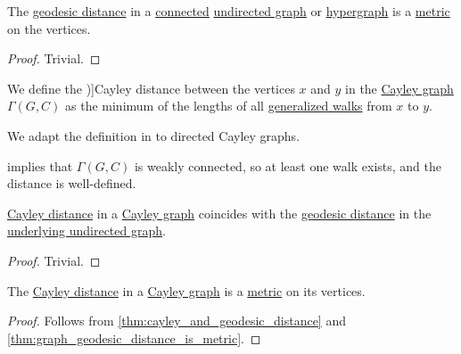 \begin{proposition}\label{thm:graph_geodesic_distance_is_metric}
  The \hyperref[def:graph_geodesic_distance]{geodesic distance} in a \hyperref[def:graph_connectedness/undirected]{connected} \hyperref[def:undirected_graph]{undirected graph} or \hyperref[def:hypergraph]{hypergraph} is a \hyperref[def:metric_space]{metric} on the vertices.
\end{proposition}
\begin{proof}
  Trivial.
\end{proof}

\begin{definition}\label{def:cayley_distance}\mimprovised
  We define the \term[en=Cayley distance (\cite[def. 2.1.10]{HadelerMüller2017CellularAutomata})]{Cayley distance} between the vertices \( x \) and \( y \) in the \hyperref[def:cayley_graph]{Cayley graph} \( \Gamma(G, C) \) as the minimum of the lengths of all \hyperref[def:graph_walk/generalized]{generalized walks} from \( x \) to \( y \).
\end{definition}
\begin{comments}
  \item We adapt the definition in \cite[def. 2.1.10]{HadelerMüller2017CellularAutomata} to directed Cayley graphs.
\end{comments}
\begin{defproof}
   implies that \( \Gamma(G, C) \) is weakly connected, so at least one walk exists, and the distance is well-defined.
\end{defproof}

\begin{proposition}\label{thm:cayley_and_geodesic_distance}
  \hyperref[def:cayley_distance]{Cayley distance} in a \hyperref[def:cayley_graph]{Cayley graph} coincides with the \hyperref[def:graph_geodesic_distance]{geodesic distance} in the \hyperref[def:multigraph_orientation]{underlying undirected graph}.
\end{proposition}
\begin{proof}
  Trivial.
\end{proof}

\begin{corollary}\label{thm:cayley_distance_is_metric}
  The \hyperref[def:cayley_distance]{Cayley distance} in a \hyperref[def:cayley_graph]{Cayley graph} is a \hyperref[def:metric_space]{metric} on its vertices.
\end{corollary}
\begin{proof}
  Follows from \cref{thm:cayley_and_geodesic_distance} and \cref{thm:graph_geodesic_distance_is_metric}.
\end{proof}

